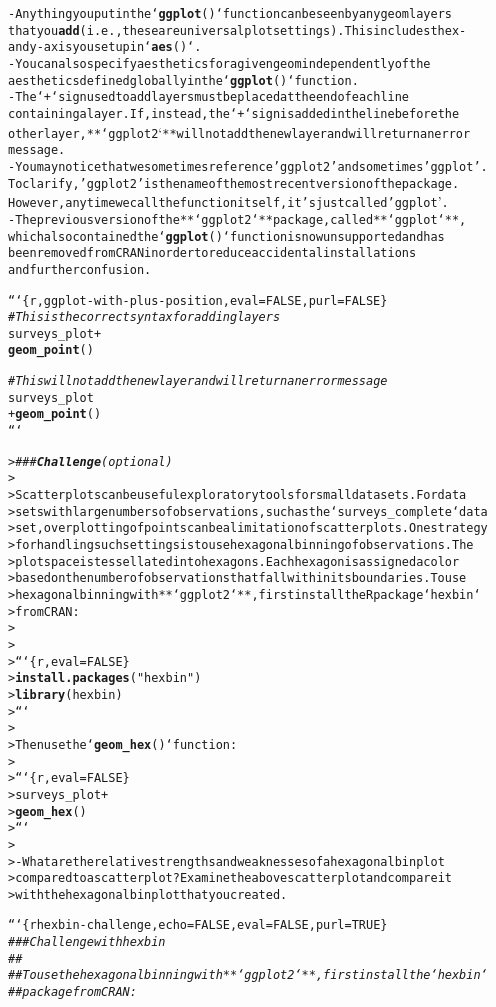 \documentclass{article}\usepackage[]{graphicx}\usepackage[]{xcolor}
\makeatletter
\newcommand{\hlstr}[1]{\textcolor[rgb]{0.192,0.494,0.8}{#1}}%
\newcommand{\hlcom}[1]{\textcolor[rgb]{0.678,0.584,0.686}{\textit{#1}}}%
\newcommand{\hlkwd}[1]{\textcolor[rgb]{0.737,0.353,0.396}{\textbf{#1}}}%
\newenvironment{kframe}{%
 \def\at@end@of@kframe{}%
 \ifinner\ifhmode%
  \def\at@end@of@kframe{\end{minipage}}%
  \begin{minipage}{\columnwidth}%
 \fi\fi%
 \def\FrameCommand##1{\hskip\@totalleftmargin \hskip-\fboxsep
 \colorbox{shadecolor}{##1}\hskip-\fboxsep
     \hskip-\linewidth \hskip-\@totalleftmargin \hskip\columnwidth}%
 \MakeFramed {\advance\hsize-\width
   \@totalleftmargin\z@ \linewidth\hsize
   \@setminipage}}%
 {\par\unskip\endMakeFramed%
 \at@end@of@kframe}
\newenvironment{knitrout}{}{} %
\makeatother
\begin{document}
\begin{knitrout}
\begin{kframe}
\begin{alltt}
- Anything you put in the `\hlkwd{ggplot}()` function can be seen by any geom layers
  that you \hlkwd{add} (i.e., these are universal plot settings). This includes the x-
  and y-axis you set up in `\hlkwd{aes}()`.
- You can also specify aesthetics for a given geom independently of the
  aesthetics defined globally in the `\hlkwd{ggplot}()` function.
- The `+` sign used to add layers must be placed at the end of each line
  containing a layer. If, instead, the `+` sign is added in the line before the
  other layer, **`ggplot2`** will not add the new layer and will return an error
  message.
- You may notice that we sometimes reference \hlstr{'ggplot2'} and sometimes \hlstr{'ggplot'}.
  To clarify, \hlstr{'ggplot2'} is the name of the most recent version of the package.
  However, any time we call the function itself, it\hlstr{'s just called '}ggplot'.
- The previous version of the **`ggplot2`** package, called **`ggplot`**,
  which also contained the `\hlkwd{ggplot}()` function is now unsupported and has
  been removed from CRAN in order to reduce accidental installations
  and further confusion.

```\{r, ggplot-with-plus-position, eval=FALSE, purl=FALSE\}
\hlcom{# This is the correct syntax for adding layers}
surveys_plot +
  \hlkwd{geom_point}()

\hlcom{# This will not add the new layer and will return an error message}
surveys_plot
  + \hlkwd{geom_point}()
```

> \hlcom{### \hlkwd{Challenge} (optional)}
>
> Scatter plots can be useful exploratory tools for small datasets. For data
> sets with large numbers of observations, such as the `surveys_complete` data
> set, overplotting of points can be a limitation of scatter plots. One strategy
> for handling such settings is to use hexagonal binning of observations. The
> plot space is tessellated into hexagons. Each hexagon is assigned a color
> based on the number of observations that fall within its boundaries.  To use
> hexagonal binning with **`ggplot2`**, first install the R package `hexbin`
> from CRAN:
>
>
> ```\{r, eval = FALSE\}
> \hlkwd{install.packages}(\hlstr{"hexbin"})
> \hlkwd{library}(hexbin)
> ```
>
> Then use the `\hlkwd{geom_hex}()` function:
>
> ```\{r, eval = FALSE\}
> surveys_plot +
>  \hlkwd{geom_hex}()
> ```
>
> - What are the relative strengths and weaknesses of a hexagonal bin plot
>   compared to a scatter plot? Examine the above scatter plot and compare it
>   with the hexagonal bin plot that you created.

```\{r hexbin-challenge, echo = FALSE, eval = FALSE, purl = TRUE\}
\hlcom{### Challenge with hexbin}
\hlcom{##}
\hlcom{## To use the hexagonal binning with **`ggplot2`**, first install the `hexbin`}
\hlcom{## package from CRAN:}


\end{alltt}
\end{kframe}
\end{knitrout}
\end{document}
